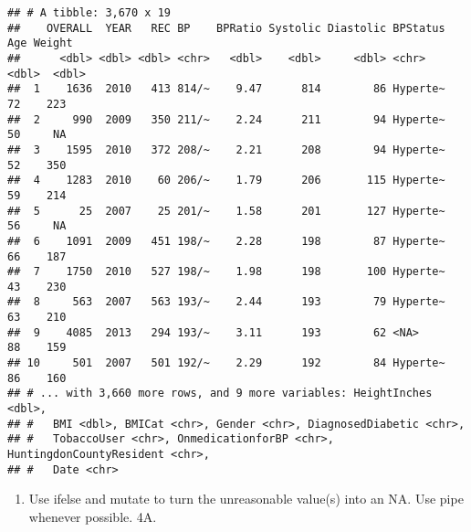 \documentclass[
]{article}
\newenvironment{Shaded}{\begin{snugshade}}{\end{snugshade}}
\newcommand{\DataTypeTok}[1]{\textcolor[rgb]{0.13,0.29,0.53}{#1}}
\newcommand{\DecValTok}[1]{\textcolor[rgb]{0.00,0.00,0.81}{#1}}
\newcommand{\KeywordTok}[1]{\textcolor[rgb]{0.13,0.29,0.53}{\textbf{#1}}}
\newcommand{\NormalTok}[1]{#1}
\newcommand{\OperatorTok}[1]{\textcolor[rgb]{0.81,0.36,0.00}{\textbf{#1}}}
\newcommand{\OtherTok}[1]{\textcolor[rgb]{0.56,0.35,0.01}{#1}}
\newcommand{\StringTok}[1]{\textcolor[rgb]{0.31,0.60,0.02}{#1}}
\providecommand{\tightlist}{%
  \setlength{\itemsep}{0pt}\setlength{\parskip}{0pt}}
\begin{document}
\begin{verbatim}
## # A tibble: 3,670 x 19
##    OVERALL  YEAR   REC BP    BPRatio Systolic Diastolic BPStatus   Age Weight
##      <dbl> <dbl> <dbl> <chr>   <dbl>    <dbl>     <dbl> <chr>    <dbl>  <dbl>
##  1    1636  2010   413 814/~    9.47      814        86 Hyperte~    72    223
##  2     990  2009   350 211/~    2.24      211        94 Hyperte~    50     NA
##  3    1595  2010   372 208/~    2.21      208        94 Hyperte~    52    350
##  4    1283  2010    60 206/~    1.79      206       115 Hyperte~    59    214
##  5      25  2007    25 201/~    1.58      201       127 Hyperte~    56     NA
##  6    1091  2009   451 198/~    2.28      198        87 Hyperte~    66    187
##  7    1750  2010   527 198/~    1.98      198       100 Hyperte~    43    230
##  8     563  2007   563 193/~    2.44      193        79 Hyperte~    63    210
##  9    4085  2013   294 193/~    3.11      193        62 <NA>        88    159
## 10     501  2007   501 192/~    2.29      192        84 Hyperte~    86    160
## # ... with 3,660 more rows, and 9 more variables: HeightInches <dbl>,
## #   BMI <dbl>, BMICat <chr>, Gender <chr>, DiagnosedDiabetic <chr>,
## #   TobaccoUser <chr>, OnmedicationforBP <chr>, HuntingdonCountyResident <chr>,
## #   Date <chr>
\end{verbatim}

\begin{enumerate}
\def\labelenumi{\arabic{enumi}.}
\setcounter{enumi}{3}
\tightlist
\item
  Use ifelse and mutate to turn the unreasonable value(s) into an NA.
  Use pipe whenever possible. 4A.
\end{enumerate}

\begin{Shaded}
\end{Shaded}
\end{document}
